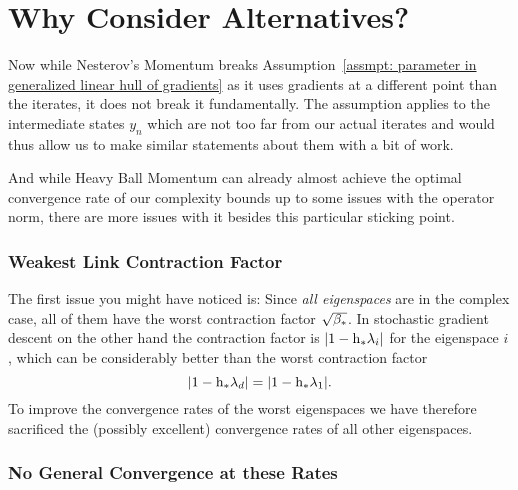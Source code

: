 \section{Why Consider Alternatives?}

Now while Nesterov's Momentum breaks Assumption~\ref{assmpt: parameter in
generalized linear hull of gradients} as it uses gradients at a
different point than the iterates, it does not break it fundamentally. The
assumption applies to the intermediate states \(y_n\) which are not too far
from our actual iterates and would thus allow us to make similar statements
about them with a bit of work.

And while Heavy Ball Momentum can already almost achieve the optimal convergence
rate of our complexity bounds up to some issues with the operator norm, there
are more issues with it besides this particular sticking point.

\subsubsection{Weakest Link Contraction Factor}

The first issue you
might have noticed is: Since \emph{all eigenspaces} are in the complex case,
all of them have the worst contraction factor \(\sqrt{\beta_*}\). In stochastic
gradient descent on the other hand the contraction factor is \(|1-\text{h}_*\lambda_i|\)
for the eigenspace \(i\), which can be considerably better than the worst
contraction factor 
\[|1-\text{h}_*\lambda_d|=|1-\text{h}_*\lambda_1|.\]
To improve the convergence rates of the worst eigenspaces we have therefore
sacrificed the (possibly excellent) convergence rates of all other eigenspaces.

\subsubsection{No General Convergence at these Rates}


